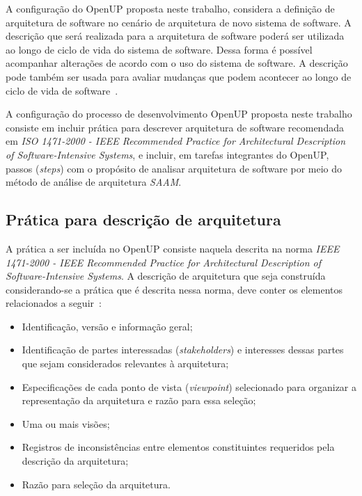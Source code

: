 A configuração do OpenUP proposta neste trabalho, considera a definição de arquitetura de software no cenário de arquitetura de novo sistema de software. A descrição que será realizada para a arquitetura de software poderá ser utilizada ao longo de ciclo de vida do sistema de software. Dessa forma é possível acompanhar alterações de acordo com o uso do sistema de software. A descrição pode também ser usada para avaliar mudanças que podem acontecer ao longo de ciclo de vida de software~\cite{ISO_1471}.

A configuração do processo de desenvolvimento OpenUP proposta neste trabalho consiste em incluir prática para descrever arquitetura de software recomendada em \emph{ISO 1471-2000 - IEEE Recommended Practice for Architectural Description of Software-Intensive Systems}, e incluir, em tarefas integrantes do OpenUP, passos (\emph{steps}) com o propósito de analisar arquitetura de software por meio do método de análise de arquitetura \emph{\acrfull{SAAM}}.

\subsection{Prática para descrição de arquitetura}
\label{sec:5.2.1}
A prática a ser incluída no OpenUP consiste naquela descrita na norma \emph{IEEE 1471-2000 - IEEE Recommended Practice for Architectural Description of Software-Intensive Systems}. A descrição de arquitetura que seja construída considerando-se a prática que é descrita nessa norma, deve conter os elementos  relacionados a seguir~\cite{ISO_1471}:

\begin{itemize}
    \item Identificação, versão e informação geral;
    \item Identificação de partes interessadas (\emph{stakeholders}) e interesses dessas partes que sejam considerados relevantes à arquitetura;
    \item Especificações de cada ponto de vista (\emph{viewpoint}) selecionado para organizar a representação da arquitetura e razão para essa seleção;
    \item Uma ou mais visões;
    \item Registros de inconsistências entre elementos constituintes requeridos pela descrição da arquitetura;
    \item Razão para seleção da arquitetura.

\end{itemize}

